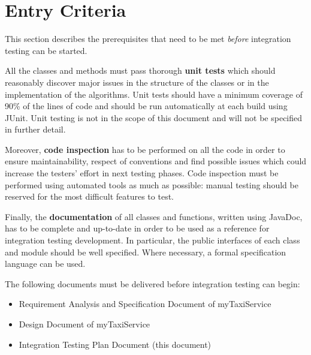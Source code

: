 \section{Entry Criteria}
\label{sec:entry-criteria}

This section describes the prerequisites that need to be met \emph{before} integration testing can be started.

All the classes and methods must pass thorough \textbf{unit tests} which should reasonably discover major issues in the structure of the classes or in the implementation of the algorithms. Unit tests should have a minimum coverage of 90\% of the lines of code and should be run automatically at each build using JUnit. Unit testing is not in the scope of this document and will not be specified in further detail.

Moreover, \textbf{code inspection} has to be performed on all the code in order to ensure maintainability, respect of conventions and find possible issues which could increase the testers' effort in next testing phases. Code inspection must be performed using automated tools as much as possible: manual testing should be reserved for the most difficult features to test.

Finally, the \textbf{documentation} of all classes and functions, written using JavaDoc, has to be complete and up-to-date in order to be used as a reference for integration testing development. In particular, the public interfaces of each class and module should be well specified. Where necessary, a formal specification language can be used.

The following documents must be delivered before integration testing can begin:
\begin{itemize}
    \item Requirement Analysis and Specification Document of myTaxiService
    \item Design Document of myTaxiService
    \item Integration Testing Plan Document (this document)
\end{itemize}
